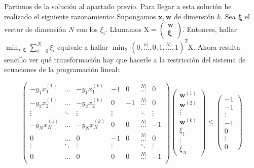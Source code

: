\documentclass[11pt,leqno]{article}
\theoremstyle{definition}
\begin{document}
\begin{solucion} 
Partimos de la solución al apartado previo. Para llegar a esta solución he realizado el siguiente razonamiento: 
Supongamos $\mathbf{x}, \mathbf{w}$ de dimensión $k$. 
Sea $\mathbf{\xi}$ el vector de dimensión $N$ con los $\xi_i$. 
Llamamos $\mathrm{X} = \left( \begin{array}{c} \mathbf{w} \\ \mathbf{\xi} \end{array}\right)$. 
Entonces, hallar $\min_{\mathbf{x},\mathbf{\xi}} \sum_{i=0}^N \xi_i$ equivale a hallar $\min_\mathrm{X} (0,\overset{k)}{\dots},0,1,\overset{N)}{\dots},1)^T \mathrm{X}$. Ahora resulta sencillo ver qué transformación hay que hacerle a la restricción del sistema de ecuaciones de la programación lineal:

\[ 
\left(\begin{array}{ccccccc}
-y_1 x_1^{(1)} 	& \dots & -y_1 x_1^{(k)} & -1 & 0 	& \overset{N)}{\dots} 	& 0 \\
-y_2 x_2^{(1)} 	& \dots & -y_2 x_2^{(k)} &  0 & -1 	& \overset{N)}{\dots} 	& 0 \\
\vdots 			& \ddots & \vdots 		 &  \vdots&	 	& \ddots			& \vdots \\
-y_N x_N^{(1)} 	& \dots & -y_N x_N^{(k)} & 0 & 0 	& \overset{N)}{\dots} 	& -1 \\
0			 	& \dots & 0				 & -1 & 0 	& \overset{N)}{\dots} 	& 0 \\
\vdots 			& \ddots & \vdots 		 &  \vdots&	 	& \ddots			& \vdots \\
0				& \dots & 0				 & 0  & 0 	& \overset{N)}{\dots} 	& -1 \\
\end{array}\right)
\left(
\begin{array}{c}
\mathbf{w}^{(1)} \\ \mathbf{w}^{(2)} \\ \vdots \\ \mathbf{w}^{(k)} \\ 
\xi_1 \\ \vdots \\ \xi_N 
\end{array}
\right)
\leq
\left(
\begin{array}{c}
-1 \\ -1 \\ \vdots \\ -1 \\  0 \\ \vdots \\ 0
\end{array}
\right)
\]


\end{solucion}
\end{document}
